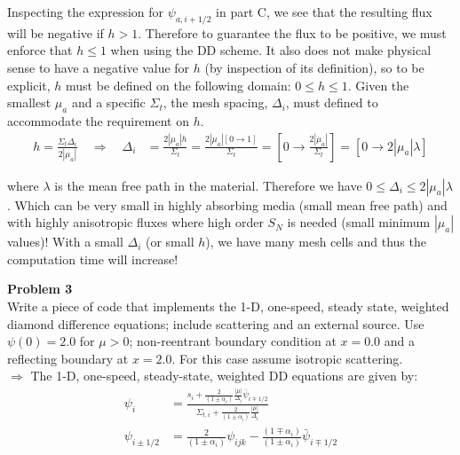 \documentclass[10pt]{article}
\begin{document}
Inspecting the expression for $\psi_{a,i+1/2}$ in part C, we see that the resulting flux will be negative if $h>1$. Therefore to guarantee the flux to be positive, we must enforce that $h\leq1$ when using the DD scheme. It also does not make physical sense to have a negative value for $h$ (by inspection of its definition), so to be explicit, $h$ must be defined on the following domain: $0\leq h \leq 1$. Given the smallest $\mu_a$ and a specific $\Sigma_t$, the mesh spacing, $\Delta_i$, must defined to accommodate the requirement on $h$.
%
\begin{align*}
    h=\frac{\Sigma_t \Delta_i}{2|\mu_a|} \quad \Rightarrow \quad \Delta_i &= \frac{2|\mu_a| h}{\Sigma_t} = \frac{2|\mu_a| [0\rightarrow1]}{\Sigma_t} = [0 \rightarrow \frac{2|\mu_a|}{\Sigma_t}] = [0 \rightarrow 2|\mu_a| \lambda]
\end{align*}

where $\lambda$ is the mean free path in the material. Therefore we have $0 \leq \Delta_i \leq 2|\mu_a|\lambda$. Which can be very small in highly absorbing media (small mean free path) and with highly anisotropic fluxes where high order $S_N$ is needed (small minimum $|\mu_a|$ values)! With a small $\Delta_i$ (or small $h$), we have many mesh cells and thus the computation time will increase!









\newpage
\noindent \textbf{Problem 3}\\
Write a piece of code that implements the 1-D, one-speed, steady state, weighted diamond difference equations; include scattering and an external source. Use $\psi(0) = 2.0$ for $\mu > 0$; non-reentrant boundary condition at $x=0.0$ and a reflecting boundary at $x=2.0$. For this case assume isotropic scattering.\\

$\Rightarrow$ The 1-D, one-speed, steady-state, weighted DD equations are given by:
%
\begin{align*}
    \psi_i &= \frac{s_i + \frac{2}{(1\pm\alpha_i)}\frac{|\mu|}{\Delta_i}\bar{\psi}_{i\mp1/2}}{\Sigma_{t,i} + \frac{2}{(1\pm\alpha_i)}\frac{|\mu|}{\Delta_i}}\\
    \psi_{i\pm1/2} &= \frac{2}{(1\pm\alpha_i)}\psi_{ijk}-\frac{(1\mp\alpha_i)}{(1\pm\alpha_i)}\bar{\psi}_{i\mp1/2}
\end{align*}
\end{document}
